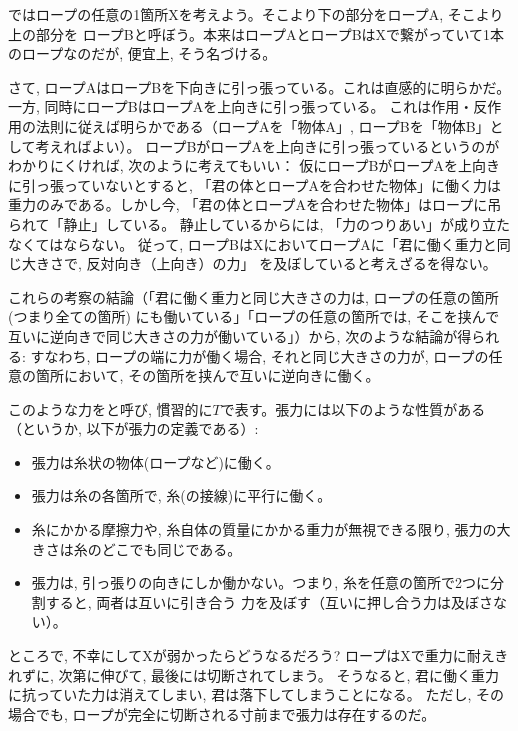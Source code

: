 ではロープの任意の1箇所Xを考えよう。そこより下の部分をロープA, そこより上の部分を
ロープBと呼ぼう。本来はロープAとロープBはXで繋がっていて1本のロープなのだが, 
便宜上, そう名づける。

さて, ロープAはロープBを下向きに引っ張っている。これは直感的に明らかだ。
一方, 同時にロープBはロープAを上向きに引っ張っている。
これは作用・反作用の法則に従えば明らかである（ロープAを「物体A」, ロープBを「物体B」として考えればよい）。
ロープBがロープAを上向きに引っ張っているというのがわかりにくければ, 次のように考えてもいい：
仮にロープBがロープAを上向きに引っ張っていないとすると, 
「君の体とロープAを合わせた物体」に働く力は重力のみである。しかし今, 
「君の体とロープAを合わせた物体」はロープに吊られて「静止」している。
静止しているからには, 「力のつりあい」が成り立たなくてはならない。
従って, ロープBはXにおいてロープAに「君に働く重力と同じ大きさで, 反対向き（上向き）の力」
を及ぼしていると考えざるを得ない。

これらの考察の結論（「君に働く重力と同じ大きさの力は, ロープの任意の箇所(つまり全ての箇所)
にも働いている」「ロープの任意の箇所では, そこを挟んで互いに逆向きで同じ大きさの力が働いている」）から, 
次のような結論が得られる: すなわち, ロープの端に力が働く場合, それと同じ大きさの力が, 
ロープの任意の箇所において, その箇所を挟んで互いに逆向きに働く。

このような力をと呼び, 慣習的に$T$で表す。張力には以下のような性質がある
（というか, 以下が張力の定義である）:
\begin{itemize}
\item 張力は糸状の物体(ロープなど)に働く。
\item 張力は糸の各箇所で, 糸(の接線)に平行に働く。
\item 糸にかかる摩擦力や, 糸自体の質量にかかる重力が無視できる限り, 張力の大きさは糸のどこでも同じである。
\item 張力は, 引っ張りの向きにしか働かない。つまり, 糸を任意の箇所で2つに分割すると, 両者は互いに引き合う
力を及ぼす（互いに押し合う力は及ぼさない）。
\end{itemize}

ところで, 不幸にしてXが弱かったらどうなるだろう? ロープはXで重力に耐えきれずに, 次第に伸びて, 最後には切断されてしまう。
そうなると, 君に働く重力に抗っていた力は消えてしまい, 君は落下してしまうことになる。
ただし, その場合でも, ロープが完全に切断される寸前まで張力は存在するのだ。

